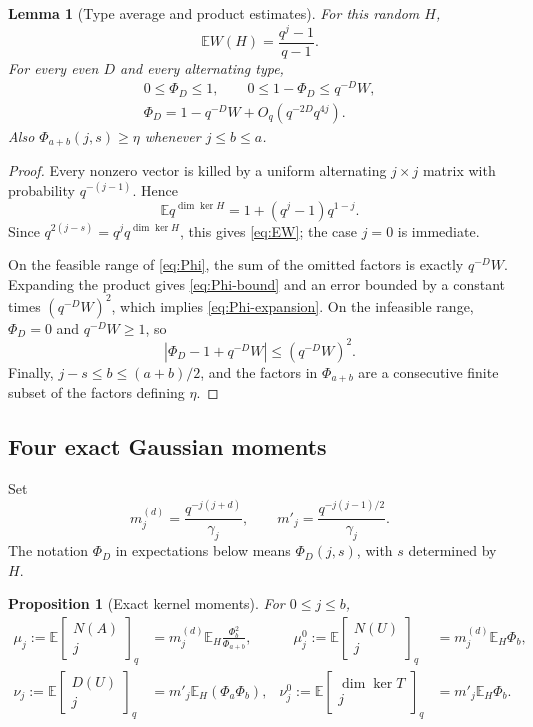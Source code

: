 \documentclass[11pt]{article}
\newtheorem{proposition}[theorem]{Proposition}
\newtheorem{lemma}[theorem]{Lemma}
\theoremstyle{definition}
\theoremstyle{remark}
\newcommand{\E}{\mathbb E}
\newcommand{\gb}[2]{\begin{bmatrix}#1\\#2\end{bmatrix}_{q}}
\begin{document}
\begin{lemma}[Type average and product estimates]\label{lem:products}
For this random $H$,
\begin{equation}\label{eq:EW}
 \E W(H)=\frac{q^j-1}{q-1}.
\end{equation}
For every even $D$ and every alternating type,
\begin{gather}
 0\le\Phi_D\le1,\qquad 0\le1-\Phi_D\le q^{-D}W,\label{eq:Phi-bound}\\
 \Phi_D=1-q^{-D}W+O_q(q^{-2D}q^{4j}).\label{eq:Phi-expansion}
\end{gather}
Also $\Phi_{a+b}(j,s)\ge\eta$ whenever $j\le b\le a$.
\end{lemma}

\begin{proof}
Every nonzero vector is killed by a uniform alternating $j\times j$ matrix with probability $q^{-(j-1)}$. Hence
\[
 \E q^{\dim\ker H}=1+(q^j-1)q^{1-j}.
\]
Since $q^{2(j-s)}=q^j q^{\dim\ker H}$, this gives \eqref{eq:EW}; the case $j=0$ is immediate.

On the feasible range of \eqref{eq:Phi}, the sum of the omitted factors is exactly $q^{-D}W$. Expanding the product gives \eqref{eq:Phi-bound} and an error bounded by a constant times $(q^{-D}W)^2$, which implies \eqref{eq:Phi-expansion}. On the infeasible range, $\Phi_D=0$ and $q^{-D}W\ge1$, so
\[
 |\Phi_D-1+q^{-D}W|\le(q^{-D}W)^2.
\]
Finally, $j-s\le b\le(a+b)/2$, and the factors in $\Phi_{a+b}$ are a consecutive finite subset of the factors defining $\eta$.
\end{proof}

\subsection{Four exact Gaussian moments}

Set
\begin{equation}\label{eq:moment-baselines}
 m_j^{(d)}=\frac{q^{-j(j+d)}}{\gamma_j},\qquad
 m'_j=\frac{q^{-j(j-1)/2}}{\gamma_j}.
\end{equation}
The notation $\Phi_D$ in expectations below means $\Phi_D(j,s)$, with $s$ determined by $H$.

\begin{proposition}[Exact kernel moments]\label{prop:moments}
For $0\le j\le b$,
\begin{align}
 \mu_j:=\E\gb{N(A)}{j}
 &=m_j^{(d)}\E_H\frac{\Phi_b^2}{\Phi_{a+b}},
 &\quad
 \mu_j^0:=\E\gb{N(U)}{j}
 &=m_j^{(d)}\E_H\Phi_b,\label{eq:mu}\\
 \nu_j:=\E\gb{D(U)}{j}
 &=m'_j\E_H(\Phi_a\Phi_b),
 &
 \nu_j^0:=\E\gb{\dim\ker T}{j}
 &=m'_j\E_H\Phi_b.\label{eq:nu}
\end{align}
\end{proposition}
\end{document}
